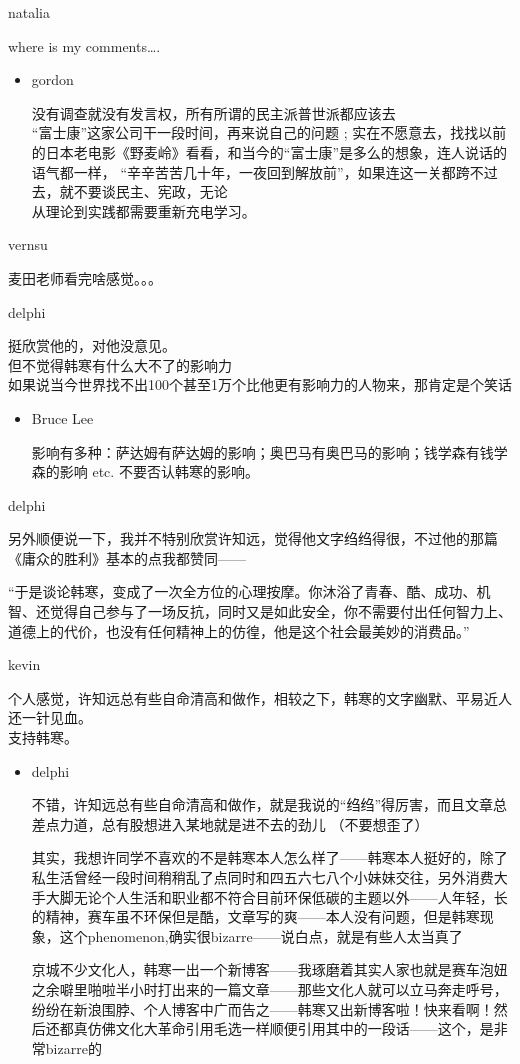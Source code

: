 natalia

where is my comments\ldots{}.

\begin{itemize}[<+->]
\item
  gordon

  没有调查就没有发言权，所有所谓的民主派普世派都应该去\\
  ``富士康''这家公司干一段时间，再来说自己的问题 ;
  实在不愿意去，找找以前的日本老电影《野麦岭》看看，和当今的``富士康''是多么的想象，连人说话的语气都一样，
  ``辛辛苦苦几十年，一夜回到解放前''，如果连这一关都跨不过去，就不要谈民主、宪政，无论\\
  从理论到实践都需要重新充电学习。
\end{itemize}

vernsu

麦田老师看完啥感觉。。。

delphi

挺欣赏他的，对他没意见。\\ 但不觉得韩寒有什么大不了的影响力\\
如果说当今世界找不出100个甚至1万个比他更有影响力的人物来，那肯定是个笑话

\begin{itemize}[<+->]
\item
  Bruce Lee

  影响有多种：萨达姆有萨达姆的影响；奥巴马有奥巴马的影响；钱学森有钱学森的影响
  etc. 不要否认韩寒的影响。
\end{itemize}

delphi

另外顺便说一下，我并不特别欣赏许知远，觉得他文字绉绉得很，不过他的那篇
《庸众的胜利》基本的点我都赞同------

``于是谈论韩寒，变成了一次全方位的心理按摩。你沐浴了青春、酷、成功、机智、还觉得自己参与了一场反抗，同时又是如此安全，你不需要付出任何智力上、道德上的代价，也没有任何精神上的仿徨，他是这个社会最美妙的消费品。''

kevin

个人感觉，许知远总有些自命清高和做作，相较之下，韩寒的文字幽默、平易近人还一针见血。\\
支持韩寒。

\begin{itemize}[<+->]
\item
  delphi

  不错，许知远总有些自命清高和做作，就是我说的``绉绉''得厉害，而且文章总差点力道，总有股想进入某地就是进不去的劲儿
  （不要想歪了）

  其实，我想许同学不喜欢的不是韩寒本人怎么样了------韩寒本人挺好的，除了私生活曾经一段时间稍稍乱了点同时和四五六七八个小妹妹交往，另外消费大手大脚无论个人生活和职业都不符合目前环保低碳的主题以外------人年轻，长的精神，赛车虽不环保但是酷，文章写的爽------本人没有问题，但是韩寒现象，这个phenomenon,确实很bizarre------说白点，就是有些人太当真了

  京城不少文化人，韩寒一出一个新博客------我琢磨着其实人家也就是赛车泡妞之余噼里啪啦半小时打出来的一篇文章------那些文化人就可以立马奔走呼号，纷纷在新浪围脖、个人博客中广而告之------韩寒又出新博客啦！快来看啊！然后还都真仿佛文化大革命引用毛选一样顺便引用其中的一段话------这个，是非常bizarre的
\end{itemize}


